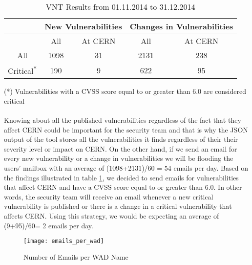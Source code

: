 \begin{table}
\begin{center}
    \begin{tabular}{ | c || c | c || c | c |}
    
    \hline
	 
     &  \multicolumn{2}{c||}{New Vulnerabilities} &  \multicolumn{2}{c|}{Changes in Vulnerabilities}  
	\\ \hline   
      &  All &  At CERN &  All &  At CERN
    \\ 
	\hline    
       All & \multicolumn{1}{|c|}{\cellcolor{red!25}1098}   &  31 & \multicolumn{1}{|c|}{\cellcolor{red!25}2131}  & 238 
   \\ \hhline{|*5-}
\hhline{~~|-|~|-|}
Critical\textsuperscript{*} & 190  & \multicolumn{1}{|c||}{\cellcolor{green!25}9}  & 622  & \multicolumn{1}{|c|}{\cellcolor{green!25}95  }
    \\ \hline
    \end{tabular}
    \caption{VNT Results from 01.11.2014 to 31.12.2014}
    \label{table:vnt_results}
   \end{center}
   \footnotesize{(*) Vulnerabilities with a CVSS score equal to or greater than 6.0 are considered critical}
    \end{table}


\paragraph{}
Knowing about all the published vulnerabilities regardless of the fact that they affect CERN could be important for the security team and that is why the JSON output of the tool stores all the vulnerabilities it finds regardless of their their severity level or impact on CERN. On the other hand, if we send an email for every new vulnerability or a change in vulnerabilities we will be flooding the users' mailbox with an average of (1098+2131)/60 = 54 emails per day. Based on the findings illustrated in table \ref{table:vnt_results}, we decided to send emails for vulnerabilities that affect CERN and have a CVSS score equal to or greater than 6.0. In other words, the security team will receive an email whenever a new critical vulnerability is published or there is a change in a critical vulnerability that affects CERN. Using this strategy, we would be expecting an average of (9+95)/60= 2 emails per day. 
\begin{figure}[h!]
\label{figure:emails_per_wad}
  \centering
    \texttt{[image: emails\_per\_wad]}
  \caption{Number of Emails per WAD Name}
\end{figure}

